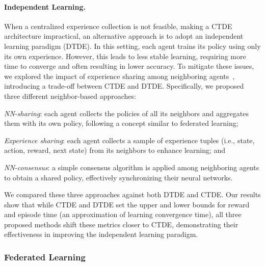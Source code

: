 \documentclass[12pt]{article}
\begin{document}
\paragraph{Independent Learning.}
When a centralized experience collection is not feasible, making a CTDE architecture impractical, 
 an alternative approach is to adopt an independent learning paradigm (DTDE). 
% 
In this setting, each agent trains its policy using only its own experience. 
%
However, this leads to less stable learning, requiring more time to converge and often resulting in lower accuracy. 
%
To mitigate these issues, we explored the impact of experience sharing among neighboring 
 agents~\cite{DBLP:conf/sac/MalucelliDAV25}, introducing a trade-off between CTDE and DTDE. 
% 
Specifically, we proposed three different neighbor-based approaches:
 \begin{enumerate*}[label=(\roman*)]
	\item \emph{NN-sharing}: each agent collects the policies of all its neighbors and aggregates them with its own policy, 
	 following a concept similar to federated learning;
	\item \emph{Experience sharing}: each agent collects a sample of experience tuples (i.e., state, action, reward, next state) 
	 from its neighbors to enhance learning; and
	\item \emph{NN-consensus}: a simple consensus algorithm is applied among neighboring agents to obtain a shared policy, 
	 effectively synchronizing their neural networks.
 \end{enumerate*}
%
We compared these three approaches against both DTDE and CTDE. 
%
Our results show that while CTDE and DTDE set the upper and lower bounds for reward and episode time (an approximation of 
 learning convergence time), all three proposed methods shift these metrics closer to CTDE, demonstrating their 
 effectiveness in improving the independent learning paradigm.

\subsubsection{Federated Learning}
\end{document}
